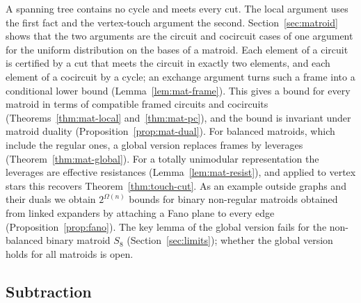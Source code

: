 A spanning tree contains no cycle and meets every cut. The local argument uses the first fact and the vertex-touch argument the second. Section~\ref{sec:matroid} shows that the two arguments are the circuit and cocircuit cases of one argument for the uniform distribution on the bases of a matroid. Each element of a circuit is certified by a cut that meets the circuit in exactly two elements, and each element of a cocircuit by a cycle; an exchange argument turns such a frame into a conditional lower bound (Lemma~\ref{lem:mat-frame}). This gives a bound for every matroid in terms of compatible framed circuits and cocircuits (Theorems~\ref{thm:mat-local} and~\ref{thm:mat-pc}), and the bound is invariant under matroid duality (Proposition~\ref{prop:mat-dual}). For balanced matroids, which include the regular ones, a global version replaces frames by leverages (Theorem~\ref{thm:mat-global}). For a totally unimodular representation the leverages are effective resistances (Lemma~\ref{lem:mat-resist}), and applied to vertex stars this recovers Theorem~\ref{thm:touch-cut}. As an example outside graphs and their duals we obtain $2^{\Omega(n)}$ bounds for binary non-regular matroids obtained from linked expanders by attaching a Fano plane to every edge (Proposition~\ref{prop:fano}). The key lemma of the global version fails for the non-balanced binary matroid $S_8$ (Section~\ref{sec:limits}); whether the global version holds for all matroids is open.

\subsection{Subtraction}

